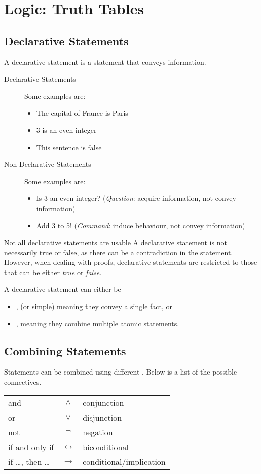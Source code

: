 \documentclass[\main/notes.tex]{subfiles}
\begin{document}
	\ifSubfilesClassLoaded{\setcounter{chapter}{8}}{}
	\chapter{Logic: Truth Tables}
		\section{Declarative Statements}
			A declarative statement is a statement that conveys information.
			\begin{description}
				\item[Declarative Statements] Some examples are:
					\begin{itemize}[nosep]
						\item The capital of France is Paris
						\item 3 is an even integer
						\item This sentence is false
					\end{itemize}
				\item[Non-Declarative Statements] Some examples are:
					\begin{itemize}[nosep]
						\item Is 3 an even integer? (\emph{Question}: acquire information, not convey information)
						\item Add 3 to 5! (\emph{Command}: induce behaviour, not convey information)
					\end{itemize}
			\end{description}
			\begin{sidenote}{Not all declarative statements are usable}
				A declarative statement is not necessarily true or false, as there can be a contradiction in the statement.\\
				However, when dealing with proofs, declarative statements are restricted to those that can be either \emph{true} or \emph{false}.
			\end{sidenote}
			A declarative statement can either be
			\begin{itemize}[nosep]
				\item {}, (or simple) meaning they convey a single fact, or
				\item {}, meaning they combine multiple atomic statements.
			\end{itemize}
		\section{Combining Statements}
			Statements can be combined using different . Below is a list of the possible connectives.
			\begin{center}
				\begin{tabular}{l c l}
					and & $\land$ & conjunction\\
					or & $\lor$ & disjunction\\
					not & $\lnot $ & negation\\
					if and only if & $\leftrightarrow$ & biconditional\\
					if \ldots, then \ldots & $\rightarrow$ & conditional/implication
				\end{tabular}
			\end{center}
\end{document}
